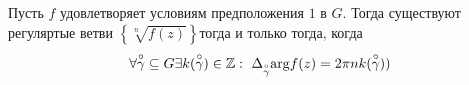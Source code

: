 Пусть $f$ удовлетворяет условиям предположения $1$ в $G$. Тогда существуют
регуляртые ветви $\left\{ \sqrt[n]{f(z)} \right\}$тогда и только тогда, когда
\begin{equation}\label{(16.15)}
    \forall \overset{\circ}{\gamma} \subseteq G \exists k(\overset{\circ}{\gamma}) \in \mathbb{Z}: \ \Delta_{\overset{\circ}{\gamma}}\mathrm{arg} f(z) = 2\pi n k(\overset{\circ}{\gamma}))
\end{equation}